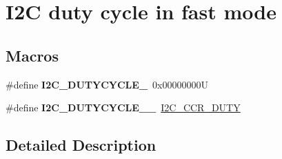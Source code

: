\hypertarget{group___i2_c__duty__cycle__in__fast__mode}{}\section{I2C duty cycle in fast mode}
\label{group___i2_c__duty__cycle__in__fast__mode}
\subsection*{Macros}
\begin{DoxyCompactItemize}
\item 
\mbox{\label{group___i2_c__duty__cycle__in__fast__mode_ga414df076d339793a7c761033346fd4ca}} 
\#define {\bfseries I2\+C\+\_\+\+D\+U\+T\+Y\+C\+Y\+C\+L\+E\+\_}~0x00000000U
\item 
\mbox{\label{group___i2_c__duty__cycle__in__fast__mode_gae9d1f8a140f052c1fcbcd87b4181f78d}} 
\#define {\bfseries I2\+C\+\_\+\+D\+U\+T\+Y\+C\+Y\+C\+L\+E\+\_\+\_}~\hyperlink{group___peripheral___registers___bits___definition_ga851c8a6b598d54c1a805b1632a4078e5}{I2\+C\+\_\+\+C\+C\+R\+\_\+\+D\+U\+TY}
\end{DoxyCompactItemize}


\subsection{Detailed Description}
